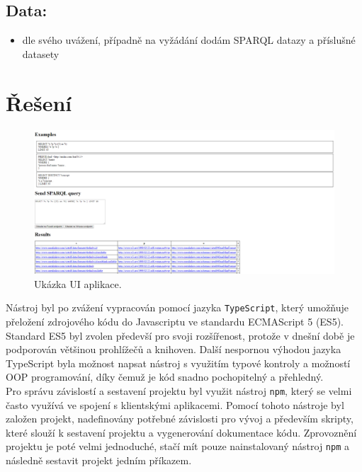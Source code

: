 \documentclass[
12pt,
a4paper,
pdftex,
czech,
titlepage
]{article}
\begin{document}
\hypertarget{data}{%
\subsection{Data:}\label{data}}

\begin{itemize}
\item
  dle svého uvážení, případně na vyžádání dodám SPARQL datazy a
  příslušné datasety
\end{itemize}

\section{Řešení}

\begin{figure}[h]
	\centering
	\includegraphics[width=\textwidth]{view}
	\caption{Ukázka UI aplikace.}
	\label{fig:ui}
\end{figure}

Nástroj byl po zvážení vypracován pomocí jazyka \texttt{TypeScript}, který umožňuje přeložení zdrojového kódu do Javascriptu ve standardu ECMAScript 5 (ES5). Standard ES5 byl zvolen předevší pro svoji rozšířenost, protože v dnešní době je podporován většinou prohlížečů a knihoven. Další nespornou výhodou jazyka TypeScript byla možnost napsat nástroj s využitím typové kontroly a možností OOP programování, díky čemuž je kód snadno pochopitelný a přehledný. \\

Pro správu závislostí a sestavení projektu byl využit nástroj \texttt{npm}, který se velmi často využívá ve spojení s klientskými aplikacemi. Pomocí tohoto nástroje byl založen projekt, nadefinovány potřebné závislosti pro vývoj a především skripty, které slouží k sestavení projektu a vygenerování dokumentace kódu. Zprovoznění projektu je poté velmi jednoduché, stačí mít pouze nainstalovaný nástroj \texttt{npm} a následně sestavit projekt jedním příkazem.
\end{document}
